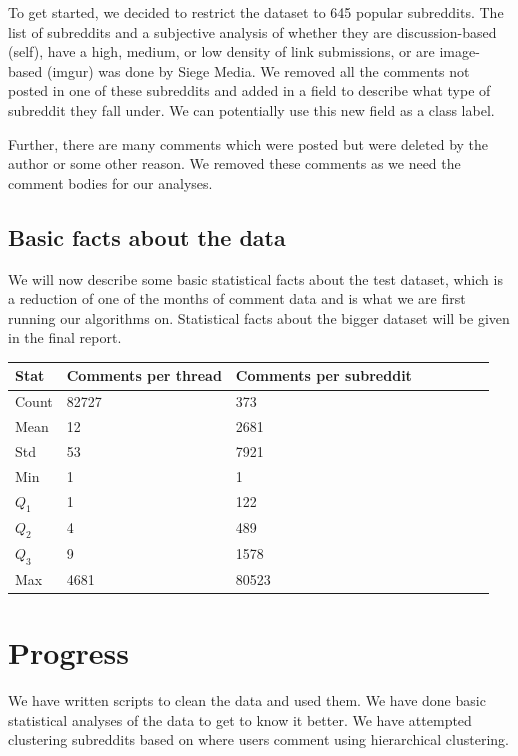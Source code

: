 \documentclass[letterpaper]{article}
\numberwithin{equation}{subsection}
\begin{document}
To get started, we decided to restrict the dataset to 645 popular subreddits. The list of subreddits and a subjective analysis of whether they are discussion-based (self), have a high, medium, or low density of link submissions, or are image-based (imgur) was done by Siege Media\cite{siege}. We removed all the comments not posted in one of these subreddits and added in a field to describe what type of subreddit they fall under. We can potentially use this new field as a class label.

Further, there are many comments which were posted but were deleted by the author or some other reason. We removed these comments as we need the comment bodies for our analyses.

\subsection{Basic facts about the data}
We will now describe some basic statistical facts about the test dataset, which is a reduction of one of the months of comment data and is what we are first running our algorithms on. Statistical facts about the bigger dataset will be given in the final report.

\begin{tabular}{l*{6}{l}r}
    Stat              & Comments per thread & Comments per subreddit \\
    \hline
    Count            & 82727    & 373 \\
    Mean             & 12       & 2681 \\
    Std              & 53       & 7921 \\
    Min              & 1        & 1 \\
    $Q_1$            & 1        & 122 \\
    $Q_2$            & 4        & 489 \\
    $Q_3$            & 9        & 1578 \\
    Max              & 4681     & 80523 \\
\end{tabular}

\section{Progress}
We have written scripts to clean the data and used them. We have done basic statistical analyses of the data to get to know it better. We have attempted clustering subreddits based on where users comment using hierarchical clustering.
\end{document}
